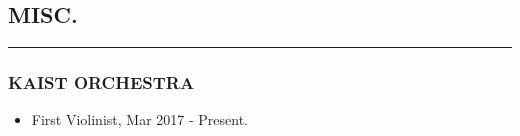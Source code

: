 \documentclass[10pt,a4]{article}
\begin{document}
\begin{small}
\begin{itemize}{}{}
\end{itemize}

\vspace{0.1cm}

%
%
%
%
%
%
%
%
%


\subsection*{MISC.}
\hrule
\vspace{0.2cm}

\subsubsection*{KAIST ORCHESTRA}
\begin{itemize}
	\item First Violinist, Mar 2017 - Present.
	

\end{itemize}
\end{small}
\end{document}

